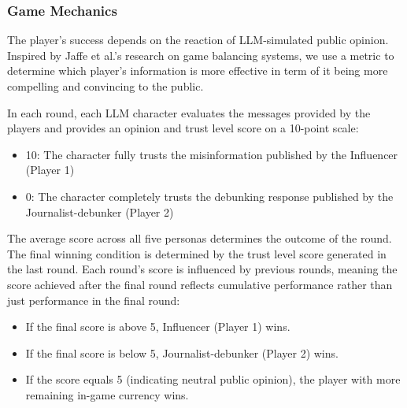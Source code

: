 \subsubsection{Game Mechanics}
The player's success depends on the reaction of LLM-simulated public opinion. Inspired by Jaffe et al.'s research on game balancing systems\cite{jaffe2012evaluating}, we use a metric to determine which player's information is more effective in term of it being more compelling and convincing to the public.

In each round, each LLM character evaluates the messages provided by the players and provides an opinion and trust level score on a 10-point scale:
\begin{itemize}
    \item 10: The character fully trusts the misinformation published by the Influencer (Player 1)
    \item 0: The character completely trusts the debunking response published by the Journalist-debunker (Player 2)
\end{itemize}

The average score across all five personas determines the outcome of the round. 
The final winning condition is determined by the trust level score generated in the last round. Each round's score is influenced by previous rounds, meaning the score achieved after the final round reflects cumulative performance rather than just performance in the final round:
\begin{itemize}
    \item If the final score is above 5, Influencer (Player 1) wins.
    \item If the final score is below 5, Journalist-debunker (Player 2) wins.
    \item If the score equals 5 (indicating neutral public opinion), the player with more remaining in-game currency wins.
\end{itemize}

